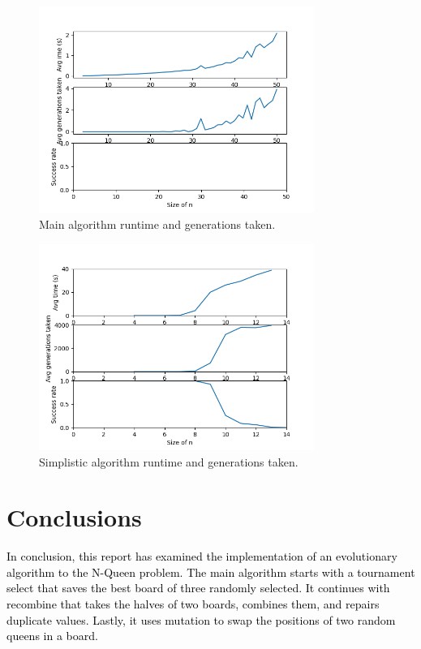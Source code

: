 \documentclass{scrartcl}
\begin{document}
\begin{figure}[H]
    \centering
    \includegraphics[width=0.8\textwidth]{figure1.png}
    \caption{Main algorithm runtime and generations taken.}
    \label{fig:main}
\end{figure}

\begin{figure}[H]
    \centering
    \includegraphics[width=0.8\textwidth]{figure2.png}
    \caption{Simplistic algorithm runtime and generations taken.}
    \label{fig:simplistic}
\end{figure}

\section{Conclusions}
\label{sec:conclusions}

\textcolor{black}{In conclusion, this report has examined the implementation of an evolutionary algorithm to the N-Queen problem. The main algorithm starts with a tournament select that saves the best board of three randomly selected. It continues with recombine that takes the halves of two boards, combines them, and repairs duplicate values. Lastly, it uses mutation to swap the positions of two random queens in a board.}



\end{document}
